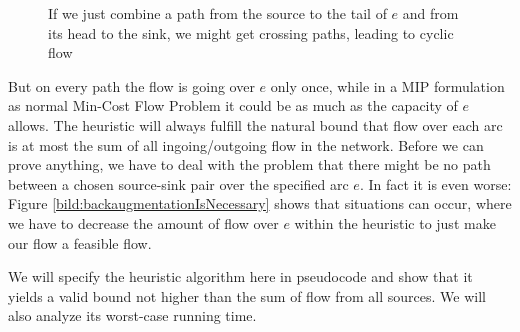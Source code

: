 \begin{figure}[h!]
\centering
{}
\caption{If we just combine a path from the source to the tail of $e$ and from its head to the sink, we might get 
crossing paths, leading to cyclic flow}
 \label{bild:cycleFromCombinedPaths}
\end{figure}

But on every path the flow is going over $e$ only once, while in a MIP formulation as normal Min-Cost Flow Problem it 
could be as much as the capacity of $e$ allows. The heuristic will always fulfill the natural bound that flow over each 
arc is at most the sum of all ingoing/outgoing flow in the network. Before we can prove anything, we have to deal with 
the problem that there might be no path between a chosen source-sink pair over the specified arc $e$. In fact it is 
even worse: Figure \ref{bild:backaugmentationIsNecessary} %
shows that situations can occur, where we have to decrease the amount of flow over $e$ within the heuristic to just 
make our flow a feasible flow. 

We will specify the heuristic algorithm here in pseudocode and show that it yields a valid bound not higher than the 
sum of flow from all sources. We will also analyze its worst-case running time.


